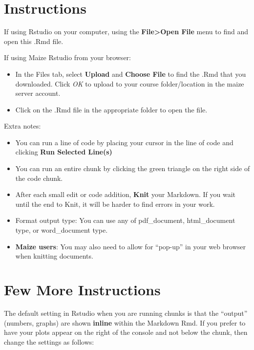 \documentclass[
]{book}
\begin{document}
\hypertarget{instructions}{%
\section{Instructions}\label{instructions}}

If using Rstudio on your computer, using the \textbf{File\textgreater Open File} menu to find and open this .Rmd file.

If using Maize Rstudio from your browser:

\begin{itemize}
\item
  In the Files tab, select \textbf{Upload} and \textbf{Choose File} to find the .Rmd that you downloaded. Click \emph{OK} to upload to your course folder/location in the maize server account.
\item
  Click on the .Rmd file in the appropriate folder to open the file.
\end{itemize}

Extra notes:

\begin{itemize}
\item
  You can run a line of code by placing your cursor in the line of code and clicking \textbf{Run Selected Line(s)}
\item
  You can run an entire chunk by clicking the green triangle on the right side of the code chunk.
\item
  After each small edit or code addition, \textbf{Knit} your Markdown. If you wait until the end to Knit, it will be harder to find errors in your work.
\item
  Format output type: You can use any of pdf\_document, html\_document type, or word\_document type.
\item
  \textbf{Maize users}: You may also need to allow for ``pop-up'' in your web browser when knitting documents.
\end{itemize}

\hypertarget{few-more-instructions}{%
\section{Few More Instructions}\label{few-more-instructions}}

The default setting in Rstudio when you are running chunks is that the ``output'' (numbers, graphs) are
shown \textbf{inline} within the Markdown Rmd. If you prefer to have your plots appear on the right of the console and not below the chunk, then change the settings as follows:
\end{document}
